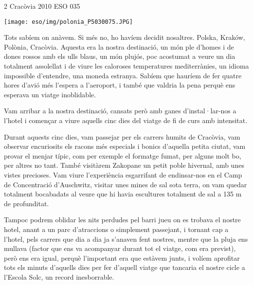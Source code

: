 \begin{news}
{2} %
{Cracòvia 2010}
{}
{ESO}
{035} %

\noindent\texttt{[image: eso/img/polonia\_P5030075.JPG]}

Tots sabíem on anàvem. Si més no, ho havíem decidit nosaltres. Polska, Kraków, Polònia, Cracòvia. Aquesta era la nostra destinació, un món ple d’homes i de dones rossos amb els ulls blaus, un món plujós, poc acostumat a veure un dia totalment assolellat i de viure les caloroses temperatures mediterrànies, un idioma impossible d’entendre, una moneda estranya. Sabíem que hauríem de fer quatre hores d’avió més l’espera a l’aeroport, i també que valdria la pena perquè ens esperava un viatge inoblidable. 

Vam arribar a la nostra destinació, cansats però amb ganes d’instal·lar-nos a l’hotel i començar a viure aquells cinc dies del viatge de fi de curs amb intensitat.

Durant aquests cinc dies, vam passejar per els carrers humits de Cracòvia, vam observar encuriosits els racons més especials i bonics d’aquella petita ciutat, vam provar el menjar típic, com per exemple el formatge fumat, per alguns molt bo, per altres no tant. També visitàrem Zakopane un petit poble hivernal, amb unes vistes precioses. Vam viure l’experiència esgarrifant de endinsar-nos en el Camp de Concentració d’Auschwitz, visitar unes mines de sal sota terra, on vam quedar totalment bocabadats al veure que hi havia escultures totalment de sal a 135 m de profunditat. 


Tampoc podrem oblidar les nits perdudes pel barri jueu on es trobava el nostre hotel, anant a un parc d’atraccions o simplement passejant, i tornant cap a l’hotel, pels carrers que dia a dia ja s’anaven fent nostres, mentre que la pluja ens mullava (factor que ens va acompanyar durant tot el viatge, com era previst), però ens era igual, perquè l’important era que estàvem junts, i volíem aprofitar tots els minuts d’aquells dies per fer d’aquell viatge que tancaria el nostre cicle a l’Escola Solc, un record inesborrable.


\end{news}

\newssep
{}

